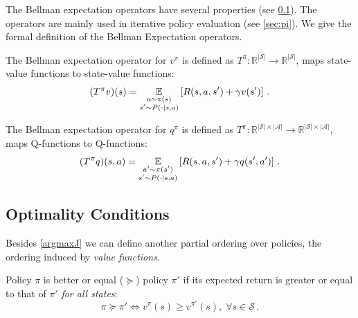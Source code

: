The Bellman expectation operators have several properties (see \ref{sec:opt-cond}). The operators are mainly used in iterative policy evaluation (see \ref{sec:pi}). We give the formal definition of the Bellman Expectation operators.
\begin{definition}
	The Bellman expectation operator for $v^\pi$ is defined as $T^{\pi} : \mathbb{R}^{| \mathcal{S} |} \rightarrow \mathbb{R}^{| \mathcal{S} | }$, maps state-value functions to state-value functions:
	\begin{equation}
		(T^{\pi} v)(s) = \underset{\begin{subarray}{c}a \sim \pi(s) \\ s' \sim P(\cdot | s,a) \end{subarray}}{\mathbb{E}} \left[ R(s,a,s') + \gamma v(s') \right] \, .
	\end{equation}
\end{definition} \label{def:bellman_exp_op_for_v}
\begin{definition}
	The Bellman expectation operator for $q^{\pi}$ is defined as $T^{\pi} : \mathbb{R}^{| \mathcal{S} | \times | \mathcal{A} |} \rightarrow \mathbb{R}^{| \mathcal{S} | \times | \mathcal{A} |}$, maps Q-functions to Q-functions:
	\begin{equation}
		(T^{\pi} q)(s,a) =\underset{\begin{subarray}{c} a' \sim \pi(s') \\ s' \sim P(\cdot | s,a) \end{subarray}}{
			\mathbb{E}} \left[ R(s,a,s') + \gamma q(s',a') \right] \, .
	\end{equation}
\end{definition} \label{def:bellman_exp_op_for_q}


\subsection{Optimality Conditions}\label{sec:opt-cond}
Besides \cref{argmaxJ} we can define another partial ordering over policies, the ordering induced by \textit{value functions}.
\begin{definition}
\label{optimal_policy}
	Policy $\pi$ is better or equal ($\succeq$) policy $\pi'$ if its expected return is greater or equal to that of $\pi'$ \textit{for all states}:
	\begin{equation}
		\pi \succeq \pi' \iff v^\pi(s) \geq v^{\pi'}(s), \; \forall s \in \mathcal{S} \, .
	\end{equation}
\end{definition}  

